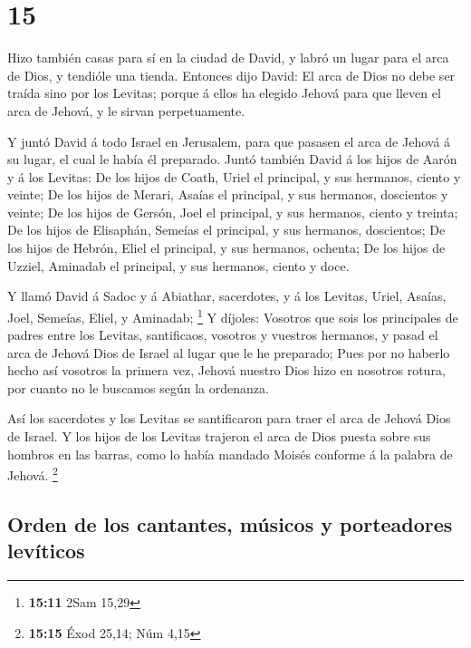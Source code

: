 \hypertarget{section-14}{%
\section{15}\label{section-14}}

 Hizo también casas para sí en la ciudad de David, y labró
un lugar para el arca de Dios, y tendióle una tienda. 
Entonces dijo David: El arca de Dios no debe ser traída sino por los
Levitas; porque á ellos ha elegido Jehová para que lleven el arca de
Jehová, y le sirvan perpetuamente.

 Y juntó David á todo Israel en Jerusalem, para que pasasen
el arca de Jehová á su lugar, el cual le había él preparado.
 Juntó también David á los hijos de Aarón y á los Levitas:
 De los hijos de Coath, Uriel el principal, y sus hermanos,
ciento y veinte;  De los hijos de Merari, Asaías el
principal, y sus hermanos, doscientos y veinte;  De los
hijos de Gersón, Joel el principal, y sus hermanos, ciento y treinta;
 De los hijos de Elisaphán, Semeías el principal, y sus
hermanos, doscientos;  De los hijos de Hebrón, Eliel el
principal, y sus hermanos, ochenta;  De los hijos de
Uzziel, Aminadab el principal, y sus hermanos, ciento y doce.

 Y llamó David á Sadoc y á Abiathar, sacerdotes, y á los
Levitas, Uriel, Asaías, Joel, Semeías, Eliel, y Aminadab; \footnote{\textbf{15:11}
  2Sam 15,29}  Y díjoles: Vosotros que sois los principales
de padres entre los Levitas, santificaos, vosotros y vuestros hermanos,
y pasad el arca de Jehová Dios de Israel al lugar que le he preparado;
 Pues por no haberlo hecho así vosotros la primera vez,
Jehová nuestro Dios hizo en nosotros rotura, por cuanto no le buscamos
según la ordenanza.

 Así los sacerdotes y los Levitas se santificaron para
traer el arca de Jehová Dios de Israel.  Y los hijos de los
Levitas trajeron el arca de Dios puesta sobre sus hombros en las barras,
como lo había mandado Moisés conforme á la palabra de Jehová.
\footnote{\textbf{15:15} Éxod 25,14; Núm 4,15}

\hypertarget{orden-de-los-cantantes-muxfasicos-y-porteadores-levuxedticos}{%
\subsection{Orden de los cantantes, músicos y porteadores
levíticos}\label{orden-de-los-cantantes-muxfasicos-y-porteadores-levuxedticos}}

